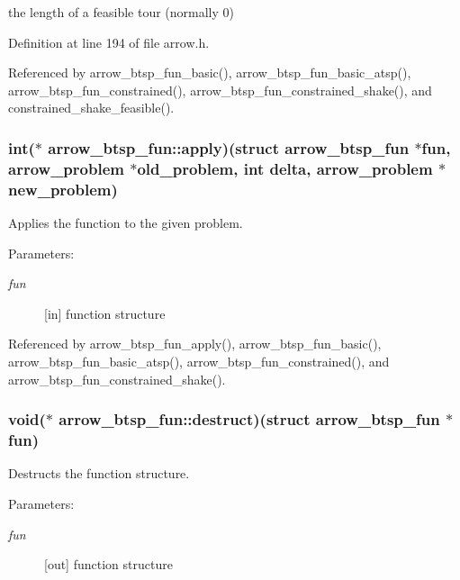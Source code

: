 the length of a feasible tour (normally 0) 

Definition at line 194 of file arrow.h.

Referenced by arrow\_\-btsp\_\-fun\_\-basic(), arrow\_\-btsp\_\-fun\_\-basic\_\-atsp(), arrow\_\-btsp\_\-fun\_\-constrained(), arrow\_\-btsp\_\-fun\_\-constrained\_\-shake(), and constrained\_\-shake\_\-feasible().\hypertarget{structarrow__btsp__fun_7736b2d3059ece3dc94433af0763b47a}{
\subsubsection{\setlength{\rightskip}{0pt plus 5cm}int($\ast$ {\bf arrow\_\-btsp\_\-fun::apply})(struct {\bf arrow\_\-btsp\_\-fun} $\ast$fun, {\bf arrow\_\-problem} $\ast$old\_\-problem, int delta, {\bf arrow\_\-problem} $\ast$new\_\-problem)}}
\label{structarrow__btsp__fun_7736b2d3059ece3dc94433af0763b47a}


Applies the function to the given problem. 

\begin{Desc}
\item[Parameters:]
\begin{description}
\item[{\em fun}]\mbox{[}in\mbox{]} function structure \end{description}
\end{Desc}


Referenced by arrow\_\-btsp\_\-fun\_\-apply(), arrow\_\-btsp\_\-fun\_\-basic(), arrow\_\-btsp\_\-fun\_\-basic\_\-atsp(), arrow\_\-btsp\_\-fun\_\-constrained(), and arrow\_\-btsp\_\-fun\_\-constrained\_\-shake().\hypertarget{structarrow__btsp__fun_6c66b7591252728aaa441139c623446a}{
\subsubsection{\setlength{\rightskip}{0pt plus 5cm}void($\ast$ {\bf arrow\_\-btsp\_\-fun::destruct})(struct {\bf arrow\_\-btsp\_\-fun} $\ast$fun)}}
\label{structarrow__btsp__fun_6c66b7591252728aaa441139c623446a}


Destructs the function structure. 

\begin{Desc}
\item[Parameters:]
\begin{description}
\item[{\em fun}]\mbox{[}out\mbox{]} function structure \end{description}
\end{Desc}


